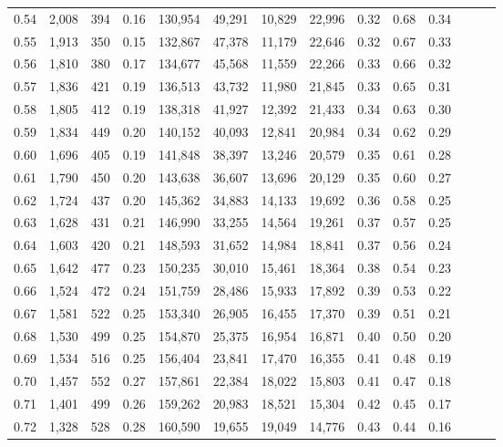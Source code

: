 \begin{tabular}{rrrrrrrrrrrrrr}
0.54 &  2,008 &  394 &  0.16 &  130,954 &   49,291 &  10,829 &  22,996 &  0.32 &  0.68 &      0.34 \\
0.55 &  1,913 &  350 &  0.15 &  132,867 &   47,378 &  11,179 &  22,646 &  0.32 &  0.67 &      0.33 \\
0.56 &  1,810 &  380 &  0.17 &  134,677 &   45,568 &  11,559 &  22,266 &  0.33 &  0.66 &      0.32 \\
0.57 &  1,836 &  421 &  0.19 &  136,513 &   43,732 &  11,980 &  21,845 &  0.33 &  0.65 &      0.31 \\
0.58 &  1,805 &  412 &  0.19 &  138,318 &   41,927 &  12,392 &  21,433 &  0.34 &  0.63 &      0.30 \\
0.59 &  1,834 &  449 &  0.20 &  140,152 &   40,093 &  12,841 &  20,984 &  0.34 &  0.62 &      0.29 \\
0.60 &  1,696 &  405 &  0.19 &  141,848 &   38,397 &  13,246 &  20,579 &  0.35 &  0.61 &      0.28 \\
0.61 &  1,790 &  450 &  0.20 &  143,638 &   36,607 &  13,696 &  20,129 &  0.35 &  0.60 &      0.27 \\
0.62 &  1,724 &  437 &  0.20 &  145,362 &   34,883 &  14,133 &  19,692 &  0.36 &  0.58 &      0.25 \\
0.63 &  1,628 &  431 &  0.21 &  146,990 &   33,255 &  14,564 &  19,261 &  0.37 &  0.57 &      0.25 \\
0.64 &  1,603 &  420 &  0.21 &  148,593 &   31,652 &  14,984 &  18,841 &  0.37 &  0.56 &      0.24 \\
0.65 &  1,642 &  477 &  0.23 &  150,235 &   30,010 &  15,461 &  18,364 &  0.38 &  0.54 &      0.23 \\
0.66 &  1,524 &  472 &  0.24 &  151,759 &   28,486 &  15,933 &  17,892 &  0.39 &  0.53 &      0.22 \\
0.67 &  1,581 &  522 &  0.25 &  153,340 &   26,905 &  16,455 &  17,370 &  0.39 &  0.51 &      0.21 \\
0.68 &  1,530 &  499 &  0.25 &  154,870 &   25,375 &  16,954 &  16,871 &  0.40 &  0.50 &      0.20 \\
0.69 &  1,534 &  516 &  0.25 &  156,404 &   23,841 &  17,470 &  16,355 &  0.41 &  0.48 &      0.19 \\
0.70 &  1,457 &  552 &  0.27 &  157,861 &   22,384 &  18,022 &  15,803 &  0.41 &  0.47 &      0.18 \\
0.71 &  1,401 &  499 &  0.26 &  159,262 &   20,983 &  18,521 &  15,304 &  0.42 &  0.45 &      0.17 \\
0.72 &  1,328 &  528 &  0.28 &  160,590 &   19,655 &  19,049 &  14,776 &  0.43 &  0.44 &      0.16 \\

\end{tabular}
